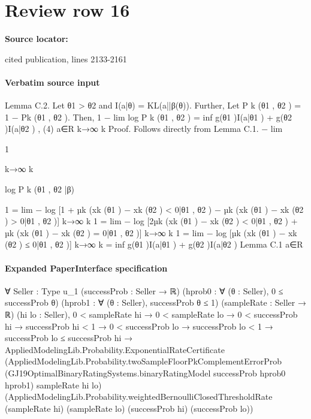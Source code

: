 \documentclass[10pt]{article}
\begin{document}
\section*{Review row 16}
\textbf{Source locator:} {\footnotesize\raggedright cited publication, lines 2133-\allowbreak{}2161\par}
\paragraph{Verbatim source input}
\begin{ReviewVerbatim}
Lemma C.2. Let θ1 > θ2 and I(a|θ) = KL(a||β(θ)). Further, Let P k (θ1 , θ2 ) = 1 − Pk (θ1 , θ2 ).
Then,
1
− lim log P k (θ1 , θ2 ) = inf {g(θ1 )I(a|θ1 ) + g(θ2 )I(a|θ2 )} ,
(4)
a∈R
k→∞ k
Proof. Follows directly from Lemma C.1.
− lim

1

k→∞ k

log P k (θ1 , θ2 |β)

1
= lim − log [1 + µk (xk (θ1 ) − xk (θ2 ) < 0|θ1 , θ2 ) − µk (xk (θ1 ) − xk (θ2 ) > 0|θ1 , θ2 )]
k→∞ k
1
= lim − log [2µk (xk (θ1 ) − xk (θ2 ) < 0|θ1 , θ2 ) + µk (xk (θ1 ) − xk (θ2 ) = 0|θ1 , θ2 )]
k→∞ k
1
= lim − log [µk (xk (θ1 ) − xk (θ2 ) ≤ 0|θ1 , θ2 )]
k→∞ k
= inf {g(θ1 )I(a|θ1 ) + g(θ2 )I(a|θ2 )}
Lemma C.1
a∈R
\end{ReviewVerbatim}



\paragraph{Expanded PaperInterface specification}
\begin{ReviewVerbatim}
∀ {Seller : Type u_1} (successProb : Seller → ℝ) (hprob0 : ∀ (θ : Seller), 0 ≤ successProb θ)
  (hprob1 : ∀ (θ : Seller), successProb θ ≤ 1) (sampleRate : Seller → ℝ) (hi lo : Seller),
  0 < sampleRate hi →
    0 < sampleRate lo →
      0 < successProb hi →
        successProb hi < 1 →
          0 < successProb lo →
            successProb lo < 1 →
              successProb lo ≤ successProb hi →
                AppliedModelingLib.Probability.ExponentialRateCertificate
                  (AppliedModelingLib.Probability.twoSampleFloorPkComplementErrorProb
                    (GJ19OptimalBinaryRatingSystems.binaryRatingModel successProb hprob0 hprob1) sampleRate hi lo)
                  (AppliedModelingLib.Probability.weightedBernoulliClosedThresholdRate (sampleRate hi) (sampleRate lo)
                    (successProb hi) (successProb lo))
\end{ReviewVerbatim}
\end{document}
